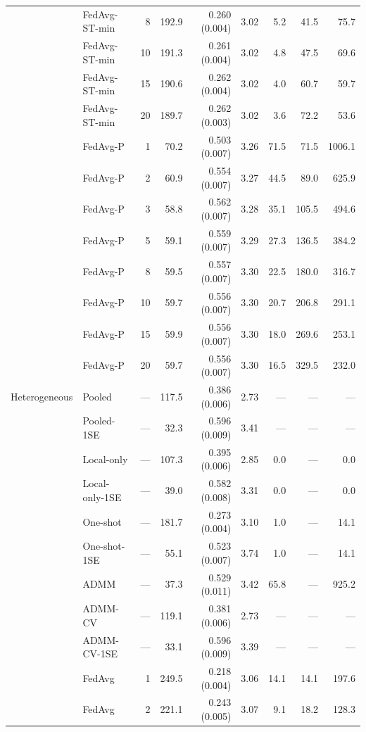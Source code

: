 \begin{longtable}{llrrrrrrr}
 & FedAvg-ST-min & 8 & 192.9 & 0.260 (0.004) & 3.02 & 5.2 & 41.5 & 75.7 \\
 & FedAvg-ST-min & 10 & 191.3 & 0.261 (0.004) & 3.02 & 4.8 & 47.5 & 69.6 \\
 & FedAvg-ST-min & 15 & 190.6 & 0.262 (0.004) & 3.02 & 4.0 & 60.7 & 59.7 \\
 & FedAvg-ST-min & 20 & 189.7 & 0.262 (0.003) & 3.02 & 3.6 & 72.2 & 53.6 \\
 & FedAvg-P & 1 & 70.2 & 0.503 (0.007) & 3.26 & 71.5 & 71.5 & 1006.1 \\
 & FedAvg-P & 2 & 60.9 & 0.554 (0.007) & 3.27 & 44.5 & 89.0 & 625.9 \\
 & FedAvg-P & 3 & 58.8 & 0.562 (0.007) & 3.28 & 35.1 & 105.5 & 494.6 \\
 & FedAvg-P & 5 & 59.1 & 0.559 (0.007) & 3.29 & 27.3 & 136.5 & 384.2 \\
 & FedAvg-P & 8 & 59.5 & 0.557 (0.007) & 3.30 & 22.5 & 180.0 & 316.7 \\
 & FedAvg-P & 10 & 59.7 & 0.556 (0.007) & 3.30 & 20.7 & 206.8 & 291.1 \\
 & FedAvg-P & 15 & 59.9 & 0.556 (0.007) & 3.30 & 18.0 & 269.6 & 253.1 \\
 & FedAvg-P & 20 & 59.7 & 0.556 (0.007) & 3.30 & 16.5 & 329.5 & 232.0 \\
\midrule
Heterogeneous & Pooled & --- & 117.5 & 0.386 (0.006) & 2.73 & --- & --- & --- \\
 & Pooled-1SE & --- & 32.3 & 0.596 (0.009) & 3.41 & --- & --- & --- \\
 & Local-only & --- & 107.3 & 0.395 (0.006) & 2.85 & 0.0 & --- & 0.0 \\
 & Local-only-1SE & --- & 39.0 & 0.582 (0.008) & 3.31 & 0.0 & --- & 0.0 \\
 & One-shot & --- & 181.7 & 0.273 (0.004) & 3.10 & 1.0 & --- & 14.1 \\
 & One-shot-1SE & --- & 55.1 & 0.523 (0.007) & 3.74 & 1.0 & --- & 14.1 \\
 & ADMM & --- & 37.3 & 0.529 (0.011) & 3.42 & 65.8 & --- & 925.2 \\
 & ADMM-CV & --- & 119.1 & 0.381 (0.006) & 2.73 & --- & --- & --- \\
 & ADMM-CV-1SE & --- & 33.1 & 0.596 (0.009) & 3.39 & --- & --- & --- \\
 & FedAvg & 1 & 249.5 & 0.218 (0.004) & 3.06 & 14.1 & 14.1 & 197.6 \\
 & FedAvg & 2 & 221.1 & 0.243 (0.005) & 3.07 & 9.1 & 18.2 & 128.3 \\

\end{longtable}
